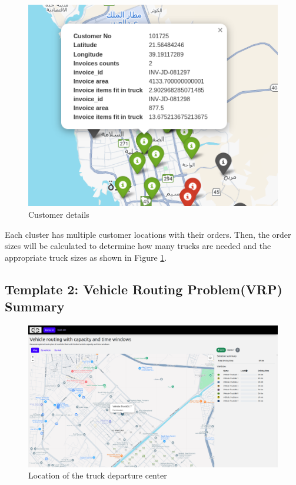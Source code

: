 \documentclass[a4paper,12pt, final]{article}
\begin{document}
\begin{figure}[htbp]
    \centering
    \includegraphics[width=\textwidth]{gfx/customer_map.png}
    \caption{Customer details}
    \label{fig:cutomer_info}
\end{figure}
Each cluster has multiple customer locations with their orders. Then, the order sizes will be calculated to determine how many trucks are needed and the appropriate truck sizes as shown in Figure \ref{fig:cutomer_info}.

\newpage
\subsection{Template 2: Vehicle Routing Problem(VRP) Summary}

\begin{figure}[htbp]
    \centering
    \includegraphics[width=\textwidth]{gfx/VRP_1.png}
    \caption{Location of the truck departure center}
    \label{fig:VRP_1}
\end{figure}
\end{document}
